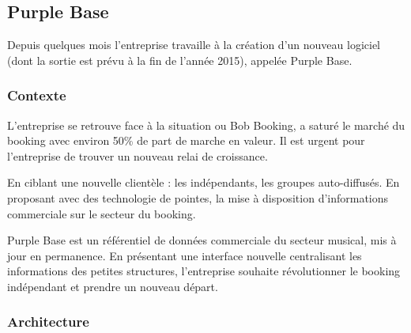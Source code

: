 \subsection{Purple Base}

Depuis quelques mois l'entreprise travaille à la création d'un nouveau logiciel (dont la sortie est prévu à la fin de l'année 2015), appelée Purple Base. 

\subsubsection{Contexte}
 L'entreprise se retrouve face à la situation ou Bob Booking, a saturé le marché du booking avec environ 50\% de \gls{part de marche en valeur}.
Il est urgent pour l'entreprise de trouver un nouveau relai de croissance. 

En ciblant une nouvelle clientèle : les indépendants, les groupes auto-diffusés.
En proposant avec des technologie de pointes, la mise à disposition d'informations commerciale sur le secteur du booking.

Purple Base est un référentiel de données commerciale du secteur musical,  mis à jour en permanence. 
En présentant une interface nouvelle centralisant les informations des petites structures, l'entreprise souhaite révolutionner le booking indépendant et prendre un nouveau départ. 



\subsubsection{Architecture}

